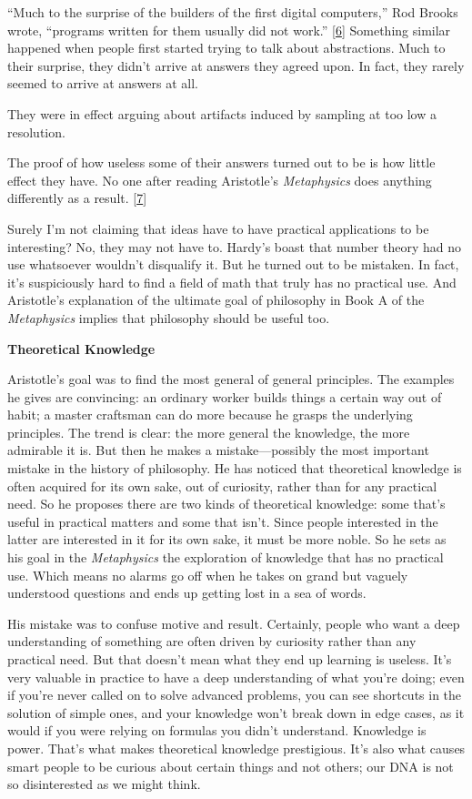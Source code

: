 ``Much to the surprise of the builders of the first digital computers,''
Rod Brooks wrote, ``programs written for them usually did not work.''
{[}\hyperref[f6n]{6}{]} Something similar happened when people first
started trying to talk about abstractions. Much to their surprise, they
didn't arrive at answers they agreed upon. In fact, they rarely seemed
to arrive at answers at all.

They were in effect arguing about artifacts induced by sampling at too
low a resolution.

The proof of how useless some of their answers turned out to be is how
little effect they have. No one after reading Aristotle's
\emph{Metaphysics} does anything differently as a result.
{[}\hyperref[f7n]{7}{]}

Surely I'm not claiming that ideas have to have practical applications
to be interesting? No, they may not have to. Hardy's boast that number
theory had no use whatsoever wouldn't disqualify it. But he turned out
to be mistaken. In fact, it's suspiciously hard to find a field of math
that truly has no practical use. And Aristotle's explanation of the
ultimate goal of philosophy in Book A of the \emph{Metaphysics} implies
that philosophy should be useful too.

\textbf{Theoretical Knowledge}

Aristotle's goal was to find the most general of general principles. The
examples he gives are convincing: an ordinary worker builds things a
certain way out of habit; a master craftsman can do more because he
grasps the underlying principles. The trend is clear: the more general
the knowledge, the more admirable it is. But then he makes a
mistake---possibly the most important mistake in the history of
philosophy. He has noticed that theoretical knowledge is often acquired
for its own sake, out of curiosity, rather than for any practical need.
So he proposes there are two kinds of theoretical knowledge: some that's
useful in practical matters and some that isn't. Since people interested
in the latter are interested in it for its own sake, it must be more
noble. So he sets as his goal in the \emph{Metaphysics} the exploration
of knowledge that has no practical use. Which means no alarms go off
when he takes on grand but vaguely understood questions and ends up
getting lost in a sea of words.

His mistake was to confuse motive and result. Certainly, people who want
a deep understanding of something are often driven by curiosity rather
than any practical need. But that doesn't mean what they end up learning
is useless. It's very valuable in practice to have a deep understanding
of what you're doing; even if you're never called on to solve advanced
problems, you can see shortcuts in the solution of simple ones, and your
knowledge won't break down in edge cases, as it would if you were
relying on formulas you didn't understand. Knowledge is power. That's
what makes theoretical knowledge prestigious. It's also what causes
smart people to be curious about certain things and not others; our DNA
is not so disinterested as we might think.

